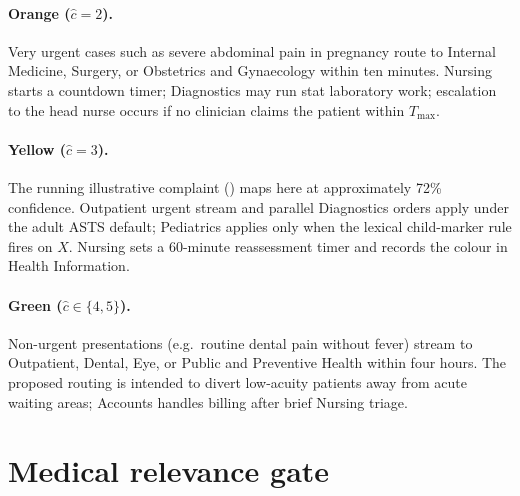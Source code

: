 \paragraph{Orange (\(\hat{c}=2\)).}
Very urgent cases such as severe abdominal pain in pregnancy route to Internal Medicine, Surgery, or Obstetrics and Gynaecology within ten minutes. Nursing starts a countdown timer; Diagnostics may run stat laboratory work; escalation to the head nurse occurs if no clinician claims the patient within \(T_{\max}\).

\paragraph{Yellow (\(\hat{c}=3\)).}
The running illustrative complaint (\runningcomplaint{}) maps here at approximately 72\% confidence. Outpatient urgent stream and parallel Diagnostics orders apply under the adult ASTS default; Pediatrics applies only when the lexical child-marker rule fires on \(X\). Nursing sets a 60-minute reassessment timer and records the colour in Health Information.

\paragraph{Green (\(\hat{c}\in\{4,5\}\)).}
Non-urgent presentations (e.g.\ routine dental pain without fever) stream to Outpatient, Dental, Eye, or Public and Preventive Health within four hours. The proposed routing is intended to divert low-acuity patients away from acute waiting areas; Accounts handles billing after brief Nursing triage.

\section{Medical relevance gate}
\label{sec:gate}

